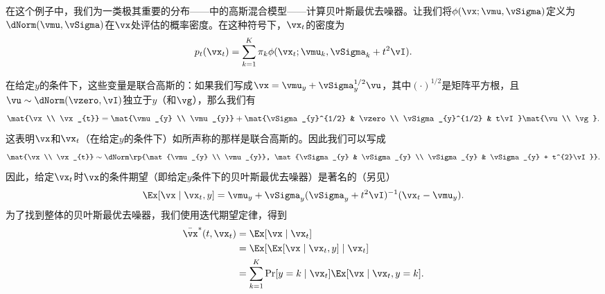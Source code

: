 \documentclass[../../book-main_zh.tex]{subfiles}
\begin{document}
\begin{example}[从高斯混合中去除高斯噪声]\label{example:denoising_gaussian_mixture}
    在这个例子中，我们为一类极其重要的分布——中的高斯混合模型——计算贝叶斯最优去噪器。让我们将\(\phi(\vx ;
    \vmu, \vSigma)\)定义为\(\dNorm(\vmu,
    \vSigma)\)在\(\vx\)处评估的概率密度。在这种符号下，\(\vx_{t}\)的密度为
    \begin{equation}
        p_{t}(\vx_{t}) = \sum_{k = 1}^{K}\pi_{k}\phi(\vx_{t} ;
        \vmu_{k}, \vSigma_{k} + t^{2}\vI).
    \end{equation}

    在给定\(y\)的条件下，这些变量是联合高斯的：如果我们写成\(\vx = \vmu_{y} + \vSigma_{y}^{1/2}\vu\)，其中\((\cdot)^{1/2}\)是矩阵平方根，且\(\vu \sim
    \dNorm(\vzero, \vI)\)独立于\(y\)（和\(\vg\)），那么我们有
    \begin{equation}
        \mat{\vx \\ \vx_{t}} = \mat{\vmu_{y} \\ \vmu_{y}} +
        \mat{\vSigma_{y}^{1/2} & \vzero \\ \vSigma_{y}^{1/2} &
        t\vI}\mat{\vu \\ \vg}.
    \end{equation}
    这表明\(\vx\)和\(\vx_{t}\)（在给定\(y\)的条件下）如所声称的那样是联合高斯的。因此我们可以写成
    \begin{equation}
        \mat{\vx \\ \vx_{t}} \sim \dNorm\rp{\mat{\vmu_{y}
            \\ \vmu_{y}}, \mat{\vSigma_{y} & \vSigma_{y} \\ \vSigma_{y} &
        \vSigma_{y} + t^{2}\vI}}.
    \end{equation}
    因此，给定\(\vx_{t}\)时\(\vx\)的条件期望（即给定\(y\)条件下的贝叶斯最优去噪器）是著名的（另见）
    \begin{equation}
        \Ex[\vx \mid \vx_{t}, y] = \vmu_{y} + \vSigma_{y}(\vSigma_{y}
        + t^{2}\vI)^{-1}(\vx_{t} - \vmu_{y}).
    \end{equation}
    为了找到整体的贝叶斯最优去噪器，我们使用迭代期望定律，得到
    \begin{align}
        \bar{\vx}^{\ast}(t, \vx_{t})
        &= \Ex[\vx \mid \vx_{t}] \\
        &= \Ex[\Ex[\vx \mid \vx_{t}, y] \mid \vx_{t}] \\
        &= \sum_{k = 1}^{K}\Pr[y = k \mid \vx_{t}]\Ex[\vx \mid \vx_{t}, y = k].
    \end{align}

\end{example}
\end{document}
